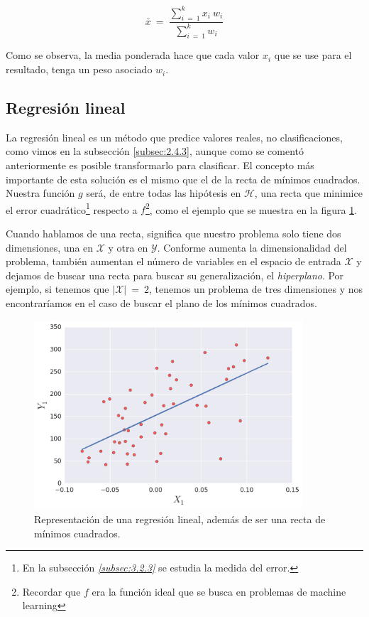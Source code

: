 $$
\bar{x}\:=\:\frac{\sum_{i\:=\:1}^{k}x_{i}\:w_{i}}{\sum_{i\:=\:1}^{k}w_{i}}
$$

Como se observa, la media ponderada hace que cada valor $x_i$ que se use para el resultado, tenga un peso asociado $w_{i}$.

\subsection{Regresión lineal} \label{subsec:2.5.3}

La regresión lineal es un método que predice valores reales, no clasificaciones, como vimos en la subsección \ref{subsec:2.4.3}, aunque como se comentó anteriormente es posible transformarlo para clasificar. El concepto más importante de esta solución es el mismo que el de la recta de mínimos cuadrados. Nuestra función $g$ será, de entre todas las hipótesis en $\mathcal{H}$, una recta que minimice el error cuadrático\footnote{En la subsección \emph{\ref{subsec:3.2.3} } se estudia la medida del error.} respecto a $f$\footnote{Recordar que $f$ era la función ideal que se busca en problemas de machine learning}, como el ejemplo que se muestra en la figura \ref{fig:2.4}.

Cuando hablamos de una recta, significa que nuestro problema solo tiene dos dimensiones, una en $\mathcal{X}$ y otra en $\mathcal{Y}$. Conforme aumenta la dimensionalidad del problema, también aumentan el número de variables en el espacio de entrada $\mathcal{X}$ y dejamos de buscar una recta para buscar su generalización, el \emph{hiperplano}. Por ejemplo, si tenemos que $|\mathcal{X}|\:=\:2$, tenemos un problema de tres dimensiones y nos encontraríamos en el caso de buscar el plano de los mínimos cuadrados.

\begin{figure}[ht]
  \centering
  \includegraphics[width=100mm]{figures/ch_02/regression_example.png}
  \caption{Representación de una regresión lineal, además de ser una recta de mínimos cuadrados.}
  \label{fig:2.4}
\end{figure}

